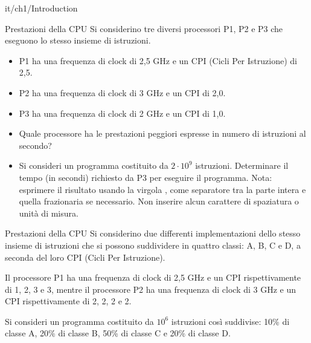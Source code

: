 \documentclass[11pt]{article}
\begin{document}
\begin{quiz}{it/ch1/Introduction}
\begin{cloze}[points=1,shuffle=false]{Prestazioni della CPU}
    Si considerino tre diversi processori P1, P2 e P3 che eseguono lo stesso insieme di istruzioni. 
    \begin{itemize}
        \item P1 ha una frequenza di clock di 2,5 GHz e un CPI (Cicli Per Istruzione) di 2,5. 
        \item P2 ha una frequenza di clock di 3 GHz e un CPI di 2,0.
        \item P3 ha una frequenza di clock di 2 GHz e un CPI di 1,0.
    \end{itemize}
    \begin{itemize}
    \item Quale processore ha le prestazioni peggiori espresse in numero di istruzioni al secondo? 
    \item Si consideri un programma costituito da $2\cdot10^9$ istruzioni. Determinare il tempo (in secondi) richiesto da P3 per eseguire il programma.
    Nota: esprimere il risultato usando la virgola , come separatore tra la parte intera e quella frazionaria se necessario. Non inserire alcun carattere di spaziatura o unità di misura.
    \end{itemize}
\end{cloze}

\begin{cloze}[points=1,shuffle=true]{Prestazioni della CPU}
Si considerino due differenti implementazioni dello stesso insieme di istruzioni che si possono suddividere in quattro classi: A, B, C e D, a seconda del loro CPI (Cicli Per Istruzione). 

Il processore P1 ha una frequenza di clock di 2,5 GHz e un CPI rispettivamente di 1, 2, 3 e 3, mentre il processore P2 ha una frequenza di clock di 3 GHz e un CPI rispettivamente di 2, 2, 2 e 2.

Si consideri un programma costituito da $10^6$ istruzioni così suddivise: 10\% di classe A, 20\% di classe B, 50\% di classe C e 20\% di classe D. 


\end{cloze}
\end{quiz}
\end{document}
